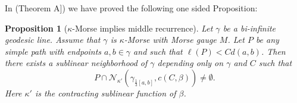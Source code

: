 \documentclass[12 pt]{amsart}
\newcommand{\calN}{\mathcal{N}}
\newcommand{\gothic}{\mathfrak}
\newcommand{\go}{{\gothic o}}
\newtheorem{proposition}[theorem]{Proposition}
\theoremstyle{definition}
\theoremstyle{remark}
\begin{document}
In \cite{JanaQing1}(Theorem A]) we have proved the following one sided Proposition:
\begin{proposition}[$\kappa$-Morse implies middle recurrence] \label{prop3.3}
Let $\gamma$ be a bi-infinite geodesic line. Assume that  $\gamma$ is $\kappa$-Morse with Morse gauge $M$. Let $P$ be any simple path with endpoints $a, b \in \gamma$ and such that $\ell(P) < C d(a, b)$. Then there exists a sublinear neighborhood of $\gamma$ depending only on $\gamma$ and $C$ such that 
\[ P \cap \calN_{\kappa'} (\gamma_{\frac13 [a,b]}, c(C, \beta)) \neq \emptyset.\]
Here $\kappa'$ is the contracting sublinear function of $\beta$.
\end{proposition}
  
\end{document}

